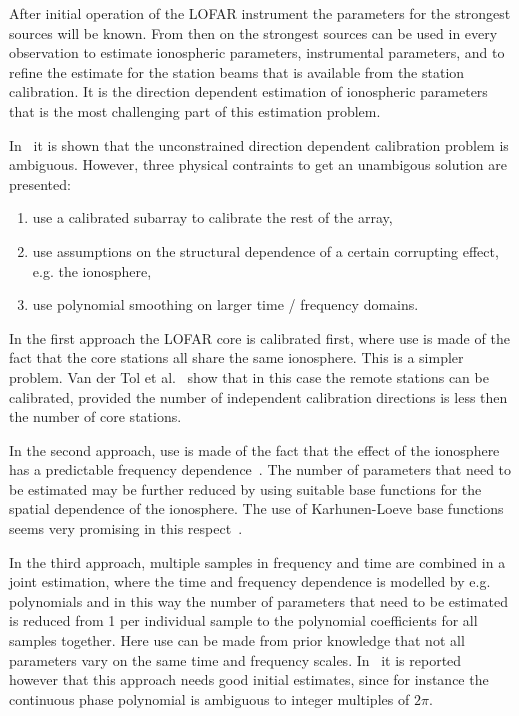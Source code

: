 \documentclass[journal]{IEEEtran}
\begin{document}
After initial operation of the LOFAR instrument the parameters for the strongest sources will be known. From then on the strongest sources can be used in every observation to estimate ionospheric parameters, instrumental parameters, and to refine the estimate for the station beams that is available from the station calibration. It is the direction dependent estimation of ionospheric parameters that is the most challenging part of this estimation problem. 

In~\cite{Tol:07} it is shown that the unconstrained direction dependent calibration problem is ambiguous. However, three physical contraints to get an unambigous solution are presented: 
%
\begin{enumerate}
\item use a calibrated subarray to calibrate the rest of the array,
\item use assumptions on the structural dependence of a certain corrupting effect, e.g. the ionosphere,
\item use polynomial smoothing on larger time / frequency domains.
\end{enumerate}
% 

In the first approach the LOFAR core is calibrated first, where use is made of the fact that the core stations all share the same ionosphere. This is a simpler problem. Van der Tol et al.~\cite{Tol:07,Tol:05} show that in this case the remote stations can be calibrated, provided the number of independent calibration directions is less then the number of core stations. 

In the second approach, use is made of the fact that the effect of the ionosphere has a predictable frequency dependence~\cite{Tol:05}. The number of parameters that need to be estimated may be further reduced by using suitable base functions for the spatial dependence of the ionosphere. The use of Karhunen-Loeve base functions seems very promising in this respect~\cite{Tol2:07}.  

In the third approach, multiple samples in frequency and time are combined in a joint estimation, where the time and frequency dependence is modelled by e.g. polynomials and in this way the number of parameters that need to be estimated is reduced from 1 per individual sample to the polynomial coefficients for all samples together. Here use can be made from prior knowledge that not all parameters vary on the same time and frequency scales. In~\cite{Tol:07} it is reported however that this approach needs good initial estimates, since for instance the continuous phase polynomial is ambiguous to integer multiples of $2\pi$.
\end{document}
